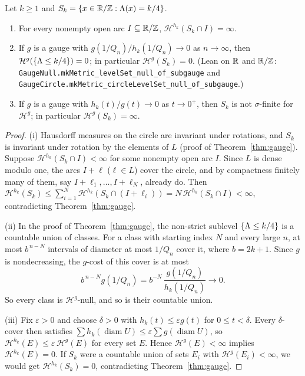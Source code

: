 \begin{corollary}\label{cor:exact-gauge}
Let $k\ge1$ and $S_k=\{x\in\mathbb{R}/\mathbb{Z}:\Lambda(x)=k/4\}$.
\begin{enumerate}[label=(\roman*)]
\item For every nonempty open arc $I\subseteq\mathbb{R}/\mathbb{Z}$,
$\mathcal H^{h_k}(S_k\cap I)=\infty$.
\item If $g$ is a gauge with $g(1/Q_n)/h_k(1/Q_n)\to0$ as $n\to\infty$, then
$\mathcal H^{g}(\{\Lambda\le k/4\})=0$; in particular $\mathcal H^g(S_k)=0$.
(Lean on $\mathbb{R}$ and $\mathbb{R}/\mathbb{Z}$: \texttt{GaugeNull.\allowbreak mkMetric\_\allowbreak levelSet\_\allowbreak null\_\allowbreak of\_\allowbreak subgauge} and \texttt{GaugeCircle.\allowbreak mkMetric\_\allowbreak circleLevelSet\_\allowbreak null\_\allowbreak of\_\allowbreak subgauge}.)
\item If $g$ is a gauge with $h_k(t)/g(t)\to0$ as $t\to0^+$, then $S_k$ is
not $\sigma$-finite for $\mathcal H^g$; in particular
$\mathcal H^g(S_k)=\infty$.
\end{enumerate}
\end{corollary}

\begin{proof}
(i) Hausdorff measures on the circle are invariant under rotations, and
$S_k$ is invariant under rotation by the elements of $L$ (proof of
Theorem~\ref{thm:gauge}). Suppose $\mathcal H^{h_k}(S_k\cap I)<\infty$ for
some nonempty open arc $I$. Since $L$ is dense modulo one, the arcs $I+\ell$
($\ell\in L$) cover the circle, and by compactness finitely many of them,
say $I+\ell_1,\ldots,I+\ell_N$, already do. Then
$\mathcal H^{h_k}(S_k)\le\sum_{i=1}^N\mathcal H^{h_k}(S_k\cap(I+\ell_i))
=N\,\mathcal H^{h_k}(S_k\cap I)<\infty$, contradicting
Theorem~\ref{thm:gauge}.

(ii) In the proof of Theorem~\ref{thm:gauge}, the non-strict sublevel
$\{\Lambda\le k/4\}$ is a countable union of classes. For a class with
starting index $N$ and every large $n$, at most $b^{\,n-N}$ intervals of
diameter at most $1/Q_n$ cover it, where $b=2k+1$. Since $g$ is
nondecreasing, the $g$-cost of this cover is at most
\[
 b^{\,n-N}g(1/Q_n)=b^{-N}\,\frac{g(1/Q_n)}{h_k(1/Q_n)}\longrightarrow0 .
\]
So every class is $\mathcal H^g$-null, and so is their countable union.

(iii) Fix $\varepsilon>0$ and choose $\delta>0$ with
$h_k(t)\le\varepsilon g(t)$ for $0\le t<\delta$. Every $\delta$-cover then
satisfies $\sum h_k(\operatorname{diam}U)\le
\varepsilon\sum g(\operatorname{diam}U)$, so
$\mathcal H^{h_k}(E)\le\varepsilon\,\mathcal H^g(E)$ for every set $E$.
Hence $\mathcal H^g(E)<\infty$ implies $\mathcal H^{h_k}(E)=0$. If $S_k$
were a countable union of sets $E_i$ with $\mathcal H^g(E_i)<\infty$, we
would get $\mathcal H^{h_k}(S_k)=0$, contradicting Theorem~\ref{thm:gauge}.
\end{proof}

